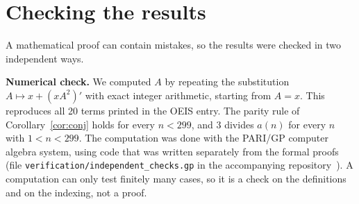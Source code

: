 \documentclass[11pt,a4paper]{article}
\theoremstyle{definition}
\theoremstyle{remark}
\newcommand{\para}[1]{\par\medskip\noindent\textbf{#1}\enspace}
\begin{document}
\section{Checking the results}\label{sec:checks}

A mathematical proof can contain mistakes, so the results were checked in two independent ways.

\para{Numerical check.}
We computed $A$ by repeating the substitution $A\mapsto x+(xA^2)'$ with exact integer arithmetic, starting from
$A=x$. This reproduces all 20 terms printed in the OEIS entry. The parity rule of Corollary~\ref{cor:conj} holds for
every $n<299$, and $3$ divides $a(n)$ for every $n$ with $1<n<299$.
The computation was done with the PARI/GP computer algebra system, using code that was written separately from the
formal proofs (file \texttt{verification/independent\_checks.gp} in the accompanying repository~\cite{repo}).
A computation can only test finitely many cases, so it is a check on the definitions and on the indexing, not a proof.
\end{document}
